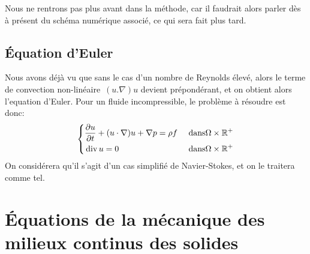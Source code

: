 Nous ne rentrons pas plus avant dans la méthode, car il faudrait alors parler dès à présent
du schéma numérique associé, ce qui sera fait plus tard.

\medskip
\subsection{Équation d'Euler}
Nous avons déjà vu que sans le cas d'un nombre de Reynolds
élevé, alors le terme de convection non-linéaire~$(u.\nabla)u$ devient prépondérant,
et on obtient alors l'equation d'Euler.
Pour un fluide incompressible, le problème à résoudre est donc:
\begin{equation}\left\{
\begin{aligned}
&\dfrac{\partial u}{\partial t} + (u\cdot\nabla) u + \nabla p = \rho f && \text{ dans} \Omega\times\mathbb R^+\\
&\operatorname{div} u = 0&& \text{ dans} \Omega\times\mathbb R^+
\end{aligned}\right.
\end{equation}
On considérera qu'il s'agit d'un cas simplifié de Navier-Stokes, et on le traitera
comme tel.

\medskip
\section{Équations de la mécanique des milieux continus des solides}
\medskip
